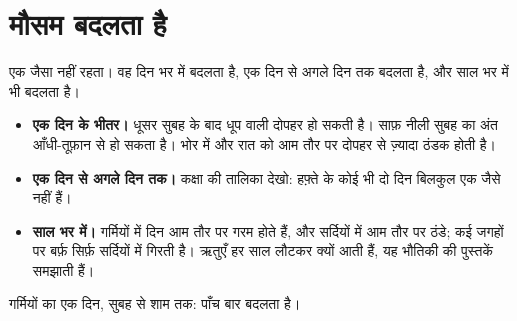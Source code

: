 \section{मौसम बदलता है}

 एक जैसा नहीं रहता। वह दिन भर में बदलता है, एक दिन से अगले दिन तक
बदलता है, और साल भर में भी बदलता है।

\begin{itemize}
  \item \textbf{एक दिन के भीतर।} धूसर सुबह के बाद धूप वाली दोपहर हो सकती
        है। साफ़ नीली सुबह का अंत आँधी-तूफ़ान से हो सकता है। भोर में और
        रात को आम तौर पर दोपहर से ज़्यादा ठंडक होती है।
  \item \textbf{एक दिन से अगले दिन तक।} कक्षा की तालिका देखो: हफ़्ते के
        कोई भी दो दिन बिलकुल एक जैसे नहीं हैं।
  \item \textbf{साल भर में।} गर्मियों में दिन आम तौर पर गरम होते हैं, और
        सर्दियों में आम तौर पर ठंडे; कई जगहों पर बर्फ़ सिर्फ़ सर्दियों में
        गिरती है। ऋतुएँ हर साल लौटकर क्यों आती हैं, यह भौतिकी की
        पुस्तकें समझाती हैं।
\end{itemize}

\begin{omfigure}

{\small गर्मियों का एक दिन, सुबह से शाम तक:  पाँच बार बदलता
है।}
\label{fig:g1:watching-the-weather:day}
\end{omfigure}

